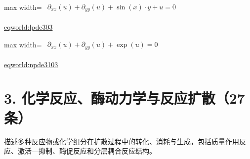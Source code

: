 \documentclass[UTF8,10pt,a4paper,fontset=mac]{ctexart}
\begin{document}
\begin{minipage}{\linewidth}\begin{center}\begin{adjustbox}{max width=\linewidth}$\displaystyle\begin{gathered}\begin{gathered}\partial_{xx}(u)+\partial_{yy}(u)+\sin(x)\cdot y+u=0\end{gathered}\end{gathered}$\end{adjustbox}\end{center}{\small\href{https://eqworld.ipmnet.ru/en/solutions/lpde/lpde303.pdf}{eqworld:lpde303}}\par\end{minipage}\par\vspace{6mm}

\begin{minipage}{\linewidth}\begin{center}\begin{adjustbox}{max width=\linewidth}$\displaystyle\begin{gathered}\begin{gathered}\partial_{xx}(u)+\partial_{yy}(u)+\exp(u)=0\end{gathered}\end{gathered}$\end{adjustbox}\end{center}{\small\href{https://eqworld.ipmnet.ru/en/solutions/npde/npde3103.pdf}{eqworld:npde3103}}\par\end{minipage}\par\vspace{6mm}

\section*{3. 化学反应、酶动力学与反应扩散（27条）}
描述多种反应物或化学组分在扩散过程中的转化、消耗与生成，包括质量作用反应、激活—抑制、酶促反应和分层耦合反应结构。\par\medskip
\end{document}
